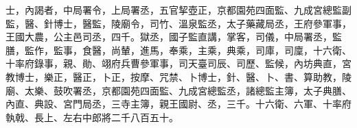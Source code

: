 \begin{pinyinscope}
士，內謁者，中局署令，上局署丞，五官挈壺正，京都園苑四面監、九成宮總監副監，醫、針博士，醫監，陵廟令，司竹、溫泉監丞，太子藥藏局丞，王府參軍事，王國大農，公主邑司丞，四千。獄丞，國子監直講，掌客，司儀，中局署丞，監膳，監作，監事，食醫，尚輦，進馬，奉乘，主乘，典乘，司庫，司廩，十六衛、十率府錄事，親、勛、翊府兵曹參軍事，司天臺司辰、司歷、監候，內坊典直，宮教博士，樂正，醫正，卜正，按摩、咒禁、卜博士，針、醫、卜、書、算助教，陵廟、太樂、鼓吹署丞，京都園苑四面監、九成宮總監丞，諸總監主簿，太子典膳、內直、典設、宮門局丞，三寺主簿，親王國尉、丞，三千。十六衛、六軍、十率府執戟、長上、左右中郎將二千八百五十。



\end{pinyinscope}